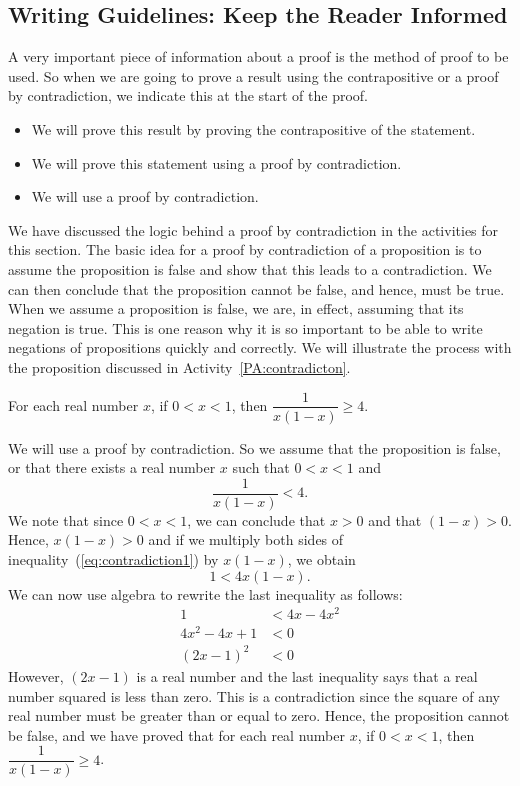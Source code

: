 \subsection*{Writing Guidelines: Keep the Reader Informed}
%

A very important piece of information about a proof is the method of proof to be used.  So when we are going to prove a result using the contrapositive or a proof by contradiction, we indicate this at the start of the proof.

\begin{itemize}
  \item We will prove this result by proving the contrapositive of the statement.
  \item We will prove this statement using a proof by contradiction.
  \item We will use a proof by contradiction.
\end{itemize}
We have discussed the logic behind a proof by contradiction in the \typel activities for this section.  The basic idea for a proof by contradiction of a proposition is to assume the proposition is false and show that this leads to a contradiction.  We can then conclude that the proposition cannot be false, and hence, must be true.  When we assume a proposition is false, we are, in effect, assuming that its negation is true.  This is one reason why it is so important to be able to write negations of propositions quickly and correctly.  We will illustrate the process with the proposition discussed in \typeu Activity~\ref*{PA:contradicton}.

\begin{proposition}
For each real number  $x$, if $0 < x < 1$, then $\dfrac{1}{x(1 - x)} \geq 4$.
\end{proposition}

\setcounter{equation}{0}
\begin{myproof}
We will use a proof by contradiction.  So we assume that the proposition is false, or that there exists a real number $x$ such that $0 < x < 1$ and
\begin{equation} \label{eq:contradiction1}
\dfrac{1}{x(1 - x)} < 4.
\end{equation}
We note that since $0 < x < 1$, we can conclude that $x > 0$ and that $(1 - x)>0$.  Hence, $x(1 - x) >0$ and if we multiply both sides of inequality~(\ref{eq:contradiction1}) by $x(1 - x)$, we obtain
\[
1 < 4x(1 - x).
\]
We can now use algebra to rewrite the last inequality as follows:
\begin{align*}
1 &< 4x - 4x^2 \\
4x^2 - 4x + 1 &< 0 \\
(2x - 1)^2 &< 0
\end{align*}
However, $(2x - 1)$ is a real number and the last inequality says that a real number squared is less than zero.  This is a contradiction since the square of any real number must be greater than or equal to zero.  Hence, the proposition cannot be false, and we have proved that for each real number  $x$, if $0 < x < 1$, then $\dfrac{1}{x(1 - x)} \geq 4$.
\end{myproof}
\hbreak

